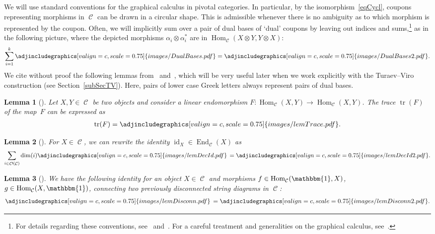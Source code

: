 \documentclass[10pt,a4paper]{amsart}
\DeclareMathOperator{\id}{id}
\DeclareMathOperator{\End}{End}
\DeclareMathOperator{\Hom}{Hom}
\DeclareMathOperator{\tr}{tr}
\DeclareMathOperator{\calc}{\mathcal{C}}
\DeclareMathOperator{\calo}{\mathcal{O}}
\numberwithin{equation}{section}
\newtheorem{Lemma}[Lemma]{Lemma}
\theoremstyle{definition}
\begin{document}
We will use standard conventions for the graphical calculus in pivotal categories. In particular, by the  isomorphism~\eqref{eqCycl}, coupons representing morphisms in $\calc$ can be drawn in a circular shape. This is admissible whenever there is no ambiguity as to which morphism is represented by the coupon. Often, we will implicitly sum over a pair of dual bases of `dual' coupons by leaving out indices and sums,\footnote{For details regarding these conventions, see~\cite{FS} and~\cite{BK}. For a careful treatment and generalities on the graphical calculus, see~\cite{TV}.} as in the following picture, where the depicted morphisms $\alpha_i \otimes \alpha_i^*$ are in $\Hom_{\calc}({X \otimes Y}, Y \otimes X)$:
\begin{align*}
 \sum_{i = 1}^k \adjincludegraphics[valign=c, scale = 0.75]{images/DualBases.pdf} = \adjincludegraphics[valign=c, scale = 0.75]{images/DualBases2.pdf}.
\end{align*}
We cite without proof the following lemmas from~\cite{BK} and~\cite{FS}, which will be very useful later when we work explicitly with the Turaev--Viro construction (see Section~\ref{subSecTV}). Here, pairs of lower case Greek letters always represent pairs of dual bases.
\begin{Lemma}[{\cite[Lemma~4]{FS}}]
 \label{lemTrace}
 Let $X, Y \in \calc$ be two objects and consider a linear endomorphism $F\colon \Hom_{\calc}(X, Y) \rightarrow \Hom_{\calc}(X, Y)$. The trace $\tr(F)$ of the map~$F$ can be expressed as
 \begin{align*}
 \tr(F)   =   \adjincludegraphics[valign=c, scale = 0.75]{images/lemTrace.pdf}.
 \end{align*}
\end{Lemma}

\begin{Lemma}[{\cite[Lemma 1.1]{BK}}]\label{lemDecId}
For $X \in \calc$, we can rewrite the identity $\id_X \in \End_{\calc}(X)$ as
 \begin{align*}
 \sum_{i \in \calo(\calc)} \dim(i) \adjincludegraphics[valign=c, scale = 0.75]{images/lemDecId.pdf} \,  =   \adjincludegraphics[valign=c, scale = 0.75]{images/lemDecId2.pdf}.
 \end{align*}
\end{Lemma}

\begin{Lemma}[{\cite[Lemma 1.3]{BK}}]\label{lemDisconn}
We have the following identity for an object $X \in \calc$ and morphisms $f \in \Hom_{\calc}(\mathbbm{1}, X)$, $g \in \Hom_{\calc}(X, \mathbbm{1})$, connecting two previously disconnected string diagrams in $\calc$:
\begin{align*}
 \adjincludegraphics[valign=c, scale = 0.75]{images/lemDisconn.pdf} \,  =   \adjincludegraphics[valign=c, scale = 0.75]{images/lemDisconn2.pdf}.
\end{align*}
\end{Lemma}
\end{document}
